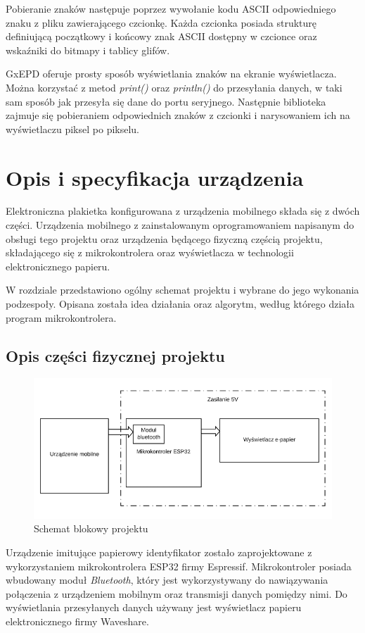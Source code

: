 \documentclass[a4paper,12pt, twoside]{article}
\begin{document}
        Pobieranie znaków następuje poprzez wywołanie kodu ASCII odpowiedniego znaku z pliku zawierającego czcionkę. Każda czcionka posiada strukturę definiującą początkowy i końcowy znak ASCII dostępny w czcionce oraz wskaźniki do bitmapy i tablicy glifów.
        
        GxEPD oferuje prosty sposób wyświetlania znaków na ekranie wyświetlacza. Można korzystać z metod \textit{print()} oraz \textit{println()} do przesyłania danych, w taki sam sposób jak przesyła się dane do portu seryjnego. Następnie biblioteka zajmuje się pobieraniem odpowiednich znaków z czcionki i narysowaniem ich na wyświetlaczu piksel po pikselu. 
        
        \newpage
    	\section{Opis i specyfikacja urządzenia}
    	Elektroniczna plakietka konfigurowana z urządzenia mobilnego składa się z dwóch części. Urządzenia mobilnego z zainstalowanym oprogramowaniem napisanym do obsługi tego projektu oraz urządzenia będącego fizyczną częścią projektu, składającego się z mikrokontrolera oraz wyświetlacza w technologii elektronicznego papieru.
    
        W rozdziale przedstawiono ogólny schemat projektu i wybrane do jego wykonania podzespoły. Opisana została idea działania oraz algorytm, według którego działa program mikrokontrolera.
        
        \subsection{Opis części fizycznej projektu}
        \begin{figure}[H]
    	        \centering
    			\includegraphics[width=12cm]{images/rys_7schemat_blokowy.png}
    			\caption{Schemat blokowy projektu}
                \label{fig:block}
    	\end{figure}
        Urządzenie imitujące papierowy identyfikator zostało zaprojektowane z wykorzystaniem mikrokontrolera ESP32 firmy Espressif. Mikrokontroler posiada wbudowany moduł \textit{Bluetooth}, który jest wykorzystywany do nawiązywania połączenia z urządzeniem mobilnym oraz transmisji danych pomiędzy nimi. Do wyświetlania przesyłanych danych używany jest wyświetlacz papieru elektronicznego firmy Waveshare.
        
\end{document}
